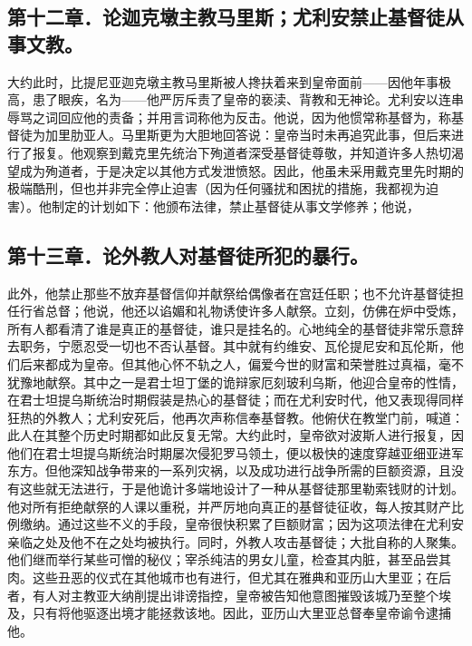 
\subsection{第十二章．论迦克墩主教马里斯；尤利安禁止基督徒从事文教。}

大约此时，比提尼亚迦克墩主教马里斯被人搀扶着来到皇帝面前——因他年事极高，患了眼疾，名为——他严厉斥责了皇帝的亵渎、背教和无神论。尤利安以连串辱骂之词回应他的责备；并用言词称他为反击。他说，因为他惯常称基督为，称基督徒为加里肋亚人。马里斯更为大胆地回答说：皇帝当时未再追究此事，但后来进行了报复。他观察到戴克里先统治下殉道者深受基督徒尊敬，并知道许多人热切渴望成为殉道者，于是决定以其他方式发泄愤怒。因此，他虽未采用戴克里先时期的极端酷刑，但也并非完全停止迫害（因为任何骚扰和困扰的措施，我都视为迫害）。他制定的计划如下：他颁布法律，禁止基督徒从事文学修养；他说，\par


\subsection{第十三章．论外教人对基督徒所犯的暴行。}

此外，他禁止那些不放弃基督信仰并献祭给偶像者在宫廷任职；也不允许基督徒担任行省总督；他说，他还以谄媚和礼物诱使许多人献祭。立刻，仿佛在炉中受炼，所有人都看清了谁是真正的基督徒，谁只是挂名的。心地纯全的基督徒非常乐意辞去职务，宁愿忍受一切也不否认基督。其中就有约维安、瓦伦提尼安和瓦伦斯，他们后来都成为皇帝。但其他心怀不轨之人，偏爱今世的财富和荣誉胜过真福，毫不犹豫地献祭。其中之一是君士坦丁堡的诡辩家厄刻玻利乌斯，他迎合皇帝的性情，在君士坦提乌斯统治时期假装是热心的基督徒；而在尤利安时代，他又表现得同样狂热的外教人；尤利安死后，他再次声称信奉基督教。他俯伏在教堂门前，喊道：此人在其整个历史时期都如此反复无常。大约此时，皇帝欲对波斯人进行报复，因他们在君士坦提乌斯统治时期屡次侵犯罗马领土，便以极快的速度穿越亚细亚进军东方。但他深知战争带来的一系列灾祸，以及成功进行战争所需的巨额资源，且没有这些就无法进行，于是他诡计多端地设计了一种从基督徒那里勒索钱财的计划。他对所有拒绝献祭的人课以重税，并严厉地向真正的基督徒征收，每人按其财产比例缴纳。通过这些不义的手段，皇帝很快积累了巨额财富；因为这项法律在尤利安亲临之处及他不在之处均被执行。同时，外教人攻击基督徒；大批自称的人聚集。他们继而举行某些可憎的秘仪；宰杀纯洁的男女儿童，检查其内脏，甚至品尝其肉。这些丑恶的仪式在其他城市也有进行，但尤其在雅典和亚历山大里亚；在后者，有人对主教亚大纳削提出诽谤指控，皇帝被告知他意图摧毁该城乃至整个埃及，只有将他驱逐出境才能拯救该地。因此，亚历山大里亚总督奉皇帝谕令逮捕他。\par

